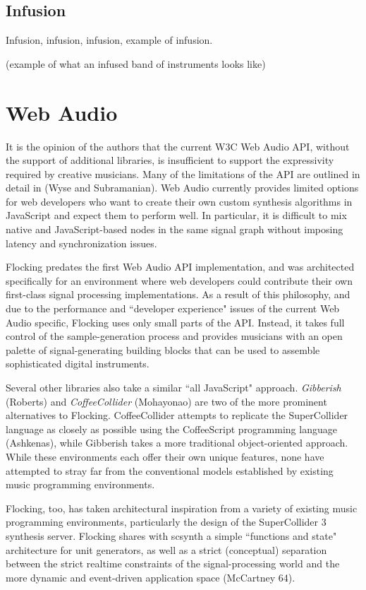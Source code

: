 \documentclass{article}
\begin{document}
\subsection{Infusion}
Infusion, infusion, infusion, example of infusion.

(example of what an infused band of instruments looks like)

\section{Web Audio}

It is the opinion of the authors that the current W3C Web Audio API, without the support of additional libraries, is insufficient to support the expressivity required by creative musicians. Many of the limitations of the API are outlined in detail in (Wyse and Subramanian). Web Audio currently provides limited options for web developers who want to create their own custom synthesis algorithms in JavaScript and expect them to perform well. In particular, it is difficult to mix native and JavaScript-based nodes in the same signal graph without imposing latency and synchronization issues.

Flocking predates the first Web Audio API implementation, and was architected specifically for an environment where web developers could contribute their own first-class signal processing implementations. As a result of this philosophy, and due to the performance and ``developer experience" issues of the current Web Audio specific, Flocking uses only small parts of the API. Instead, it takes full control of the sample-generation process and provides musicians with an open palette of signal-generating building blocks that can be used to assemble sophisticated digital instruments.

Several other libraries also take a similar ``all JavaScript" approach. {\it Gibberish} (Roberts) and {\it CoffeeCollider} (Mohayonao) are two of the more prominent alternatives to Flocking. CoffeeCollider attempts to replicate the SuperCollider language as closely as possible using the CoffeeScript programming language (Ashkenas), while Gibberish takes a more traditional object-oriented approach. While these environments each offer their own unique features, none have attempted to stray far from the conventional models established by existing music programming environments.

Flocking, too, has taken architectural inspiration from a variety of existing music programming environments, particularly the design of the SuperCollider 3 synthesis server. Flocking shares with scsynth a simple ``functions and state" architecture for unit generators, as well as a strict (conceptual) separation between the strict realtime constraints of the signal-processing world and the more dynamic and event-driven application space (McCartney 64).
\end{document}
